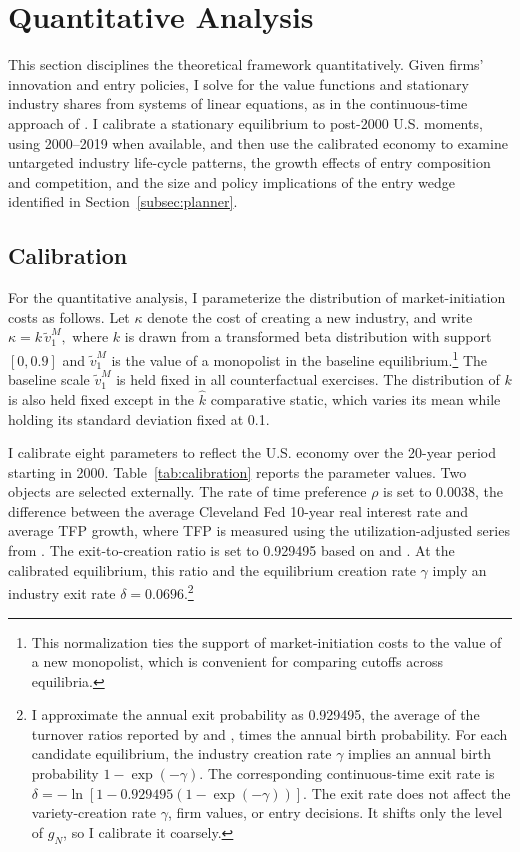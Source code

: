 \documentclass[12pt]{article}
\begin{document}
\section{Quantitative Analysis}\label{sec:quant}

This section disciplines the theoretical framework quantitatively. Given firms' innovation and entry policies, I solve for the value functions and stationary industry shares from systems of linear equations, as in the continuous-time approach of \citet{AchdouHHLM22}. I calibrate a stationary equilibrium to post-2000 U.S. moments, using 2000--2019 when available, and then use the calibrated economy to examine untargeted industry life-cycle patterns, the growth effects of entry composition and competition, and the size and policy implications of the entry wedge identified in Section~\ref{subsec:planner}.

\subsection{Calibration}\label{subsec:calibration}

For the quantitative analysis, I parameterize the distribution of market-initiation costs as follows. Let \(\kappa\) denote the cost of creating a new industry, and write \(\kappa = k \,\tilde{v}^M_1,\) where \(k\) is drawn from a transformed beta distribution with support \([0,0.9]\) and \(\tilde{v}^M_1\) is the value of a monopolist in the baseline equilibrium.\footnote{This normalization ties the support of market-initiation costs to the value of a new monopolist, which is convenient for comparing cutoffs across equilibria.} The baseline scale \(\tilde{v}^M_1\) is held fixed in all counterfactual exercises. The distribution of \(k\) is also held fixed except in the \(\hat{k}\) comparative static, which varies its mean while holding its standard deviation fixed at 0.1.

I calibrate eight parameters to reflect the U.S. economy over the 20-year period starting in 2000. Table~\ref{tab:calibration} reports the parameter values. Two objects are selected externally. The rate of time preference \(\rho\) is set to 0.0038, the difference between the average Cleveland Fed 10-year real interest rate \citep{ClevelandFedRealRate} and average TFP growth, where TFP is measured using the utilization-adjusted series from \citet{Fernald14}. The exit-to-creation ratio is set to 0.929495 based on \citet{BrodaW10} and \citet{Adhami25}. At the calibrated equilibrium, this ratio and the equilibrium creation rate \(\gamma\) imply an industry exit rate \(\delta=0.0696\).\footnote{I approximate the annual exit probability as 0.929495, the average of the turnover ratios reported by \citet{BrodaW10} and \citet{Adhami25}, times the annual birth probability. For each candidate equilibrium, the industry creation rate \(\gamma\) implies an annual birth probability \(1-\exp(-\gamma)\). The corresponding continuous-time exit rate is \(\delta=-\ln\left[1-0.929495\left(1-\exp(-\gamma)\right)\right].\) The exit rate does not affect the variety-creation rate \(\gamma\), firm values, or entry decisions. It shifts only the level of \(g_N\), so I calibrate it coarsely.}
\end{document}
